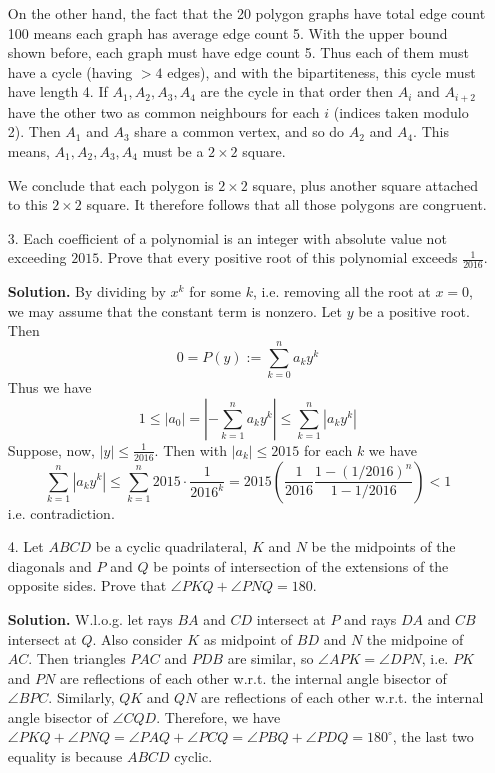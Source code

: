 \documentclass[11pt,a4paper]{article}
\begin{document}
\begin{enumerate}
	On the other hand, the fact that the 20 polygon graphs have total edge count 100 means each graph has average edge count 5. With the upper bound shown before, 
	each graph must have edge count 5. 
	Thus each of them must have a cycle (having $>4$ edges), and with the bipartiteness, 
	this cycle must have length 4. 
	If $A_1, A_2, A_3, A_4$ are the cycle in that order then $A_i$ and $A_{i+2}$ have the other two as common neighbours for each $i$ (indices taken modulo 2). 
	Then $A_1$ and $A_3$ share a common vertex, and so do $A_2$ and $A_4$. 
	This means, $A_1, A_2, A_3, A_4$ must be a $2\times 2$ square. 
	
	We conclude that each polygon is $2\times 2$ square, plus another square attached to this $2\times 2$ square. 
	It therefore follows that all those polygons are congruent. 
	
	\item[3.]
	Each coefficient of a polynomial is an integer with absolute value not exceeding $2015$.
	Prove that every positive root of this polynomial exceeds $\frac{1}{2016}$.
	
	\textbf{Solution.} 
	By dividing by $x^k$ for some $k$, i.e. removing all the root at $x=0$, we may assume that the constant term is nonzero. 
	Let $y$ be a positive root. 
	Then 
	\[
	0 = P(y) := \sum_{k=0}^n a_ky^k
	\]
	Thus we have 
	\[
	1\le |a_0| = |-\sum_{k=1}^n a_ky^k|\le \sum_{k=1}^n |a_ky^k|
	\]
	Suppose, now, $|y|\le \frac{1}{2016}$. 
	Then with $|a_k|\le 2015$ for each $k$ we have 
	\[
	\sum_{k=1}^n |a_ky^k|
	\le \sum_{k=1}^n 2015\cdot \frac{1}{2016^k}
	=2015\left(\frac{1}{2016}\frac{1-(1/2016)^n}{1-1/2016}\right)
	< 1
	\]
	i.e. contradiction. 
	
	\item[4.]
	Let $ABCD$ be a cyclic quadrilateral, $K$ and $N$ be the midpoints of the diagonals and $P$ and $Q$ be points of intersection of the extensions of the opposite sides. 
	Prove that $\angle PKQ + \angle PNQ = 180$.
	
	\textbf{Solution.} 
	W.l.o.g. let rays $BA$ and $CD$ intersect at $P$ and rays $DA$ and $CB$ intersect at $Q$. 
	Also consider $K$ as midpoint of $BD$ and $N$ the midpoine of $AC$. 
	Then triangles $PAC$ and $PDB$ are similar, 
	so $\angle APK=\angle DPN$, 
	i.e. $PK$ and $PN$ are reflections of each other w.r.t. the internal angle bisector of 
	$\angle BPC$. 
	Similarly, $QK$ and $QN$ are reflections of each other w.r.t. the internal angle bisector of $\angle CQD$. 
	Therefore, we have $\angle PKQ+\angle PNQ = \angle PAQ+\angle PCQ=\angle PBQ+\angle PDQ=180^{\circ}$, 
	the last two equality is because $ABCD$ cyclic. 
	
\end{enumerate}
\end{document}
